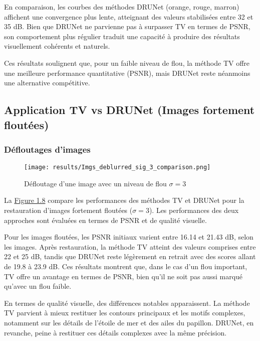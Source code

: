 \documentclass[a4paper, 12pt]{report} %
\begin{document}
En comparaison, les courbes des méthodes DRUNet (orange, rouge, marron) affichent une convergence plus lente, atteignant des valeurs stabilisées entre 32 et 35 dB. Bien que DRUNet ne parvienne pas à surpasser TV en termes de PSNR, son comportement plus régulier traduit une capacité à produire des résultats visuellement cohérents et naturels.

Ces résultats soulignent que, pour un faible niveau de flou, la méthode TV offre une meilleure performance quantitative (PSNR), mais DRUNet reste néanmoins une alternative compétitive.


\subsection{Application TV vs DRUNet (Images fortement floutées)}

\subsubsection{Défloutages d'images}

\begin{figure}[H]
\centering
\begin{adjustbox}{width=0.985\linewidth, totalheight=0.47 \textheight, angle=0, scale= 0.9, minipage= 4.2\linewidth, margin= 0}
    \texttt{[image: results/Imgs\_deblurred\_sig\_3\_comparison.png]}
\end{adjustbox}
    \caption{Défloutage d'une image avec un niveau de flou $\sigma = 3$}
    \label{fig:8}
\end{figure} 

La \hyperref[fig:8]{Figure 1.8} compare les performances des méthodes TV et DRUNet pour la restauration d’images fortement floutées (\(\sigma = 3\)). Les performances des deux approches sont évaluées en termes de PSNR et de qualité visuelle.

Pour les images floutées, les PSNR initiaux varient entre 16.14 et 21.43 dB, selon les images. Après restauration, la méthode TV atteint des valeurs comprises entre 22 et 25 dB, tandis que DRUNet reste légèrement en retrait avec des scores allant de 19.8 à 23.9 dB. Ces résultats montrent que, dans le cas d’un flou important, TV offre un avantage en termes de PSNR, bien qu’il ne soit pas aussi marqué qu’avec un flou faible.

En termes de qualité visuelle, des différences notables apparaissent. La méthode TV parvient à mieux restituer les contours principaux et les motifs complexes, notamment sur les détails de l’étoile de mer et des ailes du papillon. DRUNet, en revanche, peine à restituer ces détails complexes avec la même précision.
\end{document}

